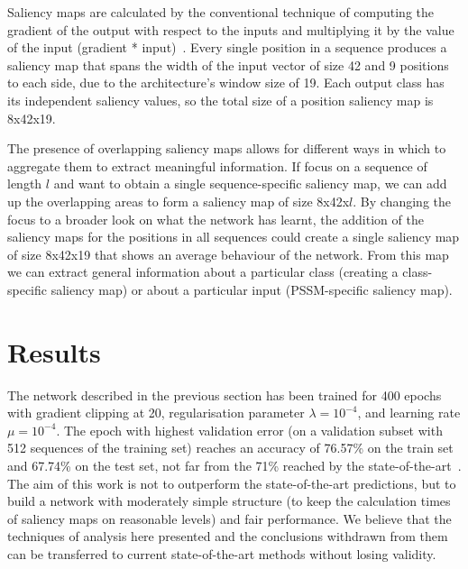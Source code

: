 \documentclass{article}
\begin{document}
Saliency maps are calculated by the conventional technique of computing the gradient of the output with respect to the inputs and multiplying it by the value of the input (gradient * input)~\cite{Shrikumar2016}. Every single position in a sequence produces a saliency map that spans the width of the input vector of size 42 and 9 positions to each side, due to the architecture's window size of 19. Each output class has its independent saliency values, so the total size of a position saliency map is 8x42x19.

The presence of overlapping saliency maps allows for different ways in which to aggregate them to extract meaningful information. If focus on a sequence of length $l$ and want to obtain a single sequence-specific saliency map, we can add up the overlapping areas to form a saliency map of size 8x42x$l$. By changing the focus to a broader look on what the network has learnt, the addition of the saliency maps for the positions in all sequences could create a single saliency map of size 8x42x19 that shows an average behaviour of the network. From this map we can extract general information about a particular class (creating a class-specific saliency map) or about a particular input (PSSM-specific saliency map).

\section{Results}
\label{sec:results}

The network described in the previous section has been trained for 400 epochs with gradient clipping at 20, regularisation parameter $\lambda=10^{-4}$, and learning rate $\mu=10^{-4}$. The epoch with highest validation error (on a validation subset with 512 sequences of the training set) reaches an accuracy of 76.57\% on the train set and 67.74\% on the test set, not far from the 71\% reached by the state-of-the-art~\cite{Busia2017}. The aim of this work is not to outperform the state-of-the-art predictions, but to build a network with moderately simple structure (to keep the calculation times of saliency maps on reasonable levels) and fair performance. We believe that the techniques of analysis here presented and the conclusions withdrawn from them can be transferred to current state-of-the-art methods without losing validity.
\end{document}
